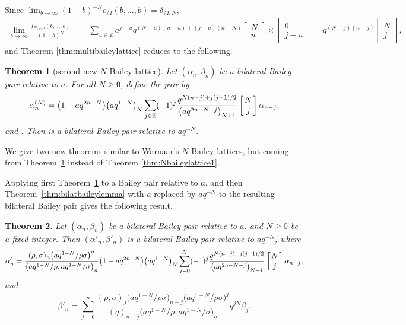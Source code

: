 \documentclass[pdftex]{sigma}
\numberwithin{equation}{section}
\newtheorem{Theorem}{Theorem}[section]
\begin{document}
 Since $\lim_{b\to\infty} (1-b)^{-N} e_M(b,\dots,b)=\delta_{M,N}$,
\begin{align*}
\lim_{b \to\infty} \frac{f_{N,j,n}(b,\ldots,b)}{(1-b)^N} &=\sum_{u\in \mathbb{Z}} a^{j-u}q^{(N-u)(n-u)+(j-u)(n-N)} \begin{bmatrix}
N\\
u
\end{bmatrix} \times \begin{bmatrix}
0\\
j-u
\end{bmatrix} = q^{(N-j)(n-j)}\begin{bmatrix}
N\\
j
\end{bmatrix},
\end{align*}
and Theorem \ref{thm:multibaileylattice} reduces to the following.

\begin{Theorem}[second new $N$-Bailey lattice]\label{thm:Nbaileylattice2}
Let $(\alpha_n, \beta_n)$ be a bilateral Bailey pair relative to $a$. For all $N\geq 0$, define the pair  by
\[%
\alpha^{(N)}_n=\bigl(1-aq^{2n-N}\bigr)\bigl(aq^{1-N}\bigr)_N\sum_{j\in \mathbb{Z}}(-1)^j\frac{q^{N(n-j)+j(j-1)/2}}{\bigl(aq^{2n-N-j}\bigr)_{N+1}}\left[{N\atop j}\right]\alpha_{n-j},
\]
and
.
Then  is a bilateral Bailey pair relative to $aq^{-N}$.
\end{Theorem}

We give two new theorems similar to Warnaar's $N$-Bailey lattices, but coming from Theorem~\ref{thm:Nbaileylattice2} instead of Theorem \ref{thm:Nbaileylattice1}.

Applying first Theorem~\ref{thm:Nbaileylattice2} to a Bailey pair relative to $a$, and then Theorem~\ref{thm:bilatbaileylemma} with $a$ replaced by $aq^{-N}$ to the resulting bilateral Bailey pair gives the following result.

\begin{Theorem}\label{thm:analogw1}
Let $(\alpha_n, \beta_n)$ be a bilateral Bailey pair relative to $a$, and $N\geq 0$ be a fixed integer. Then $(\alpha'_n, \beta'_n)$ is a bilateral Bailey pair relative to $aq^{-N}$, where
\begin{equation*}
\alpha'_n=\frac{(\rho,\sigma)_n\bigl(aq^{1-N}/\rho\sigma\bigr)^n}{
\bigl(aq^{1-N}/\rho,aq^{1-N}/\sigma\bigr)_n}\bigl(1-aq^{2n-N}\bigr)\bigl(aq^{1-N}\bigr)_N\sum_{j=0}^N(-1)^j\frac{q^{N(n-j)+j(j-1)/2}}{\bigl(aq^{2n-N-j}\bigr)_{N+1}}\left[{N\atop j}\right]\alpha_{n-j},
\end{equation*}
and
\begin{equation*}
\beta'_n=\sum_{j=0}^n\frac{(\rho,\sigma)_j\bigl(aq^{1-N}/\rho\sigma\bigr)_{n-j}\bigl(aq^{1-N}/\rho\sigma\bigr)^j}{(q)_{n-j}\bigl(aq^{1-N}/\rho,aq^{1-N}/\sigma\bigr)_n} q^{jN}\beta_j.
\end{equation*}
\end{Theorem}
\end{document}
